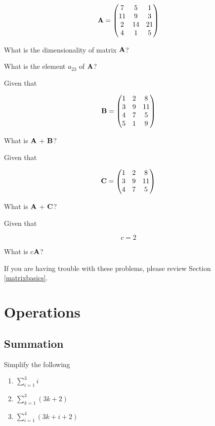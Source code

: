 \documentclass[
]{book}
\theoremstyle{definition}
\theoremstyle{definition}
\theoremstyle{definition}
\theoremstyle{definition}
\theoremstyle{remark}
\begin{document}
\[{\bf A}=\begin{pmatrix}
            7 & 5 & 1 \\
            11 & 9 & 3 \\ 
            2 & 14 & 21 \\ 
            4 & 1 & 5
        \end{pmatrix}\]

What is the dimensionality of matrix \({\bf A}\)?

What is the element \(a_{23}\) of \({\bf A}\)?

Given that

\[{\bf B}=\begin{pmatrix}
            1 & 2 & 8 \\
            3 & 9 & 11 \\ 
            4 & 7 & 5 \\ 
            5 & 1 & 9
        \end{pmatrix}\]

What is \({\bf A}\) + \({\bf B}\)?

Given that

\[{\bf C}=\begin{pmatrix}
            1 & 2 & 8 \\
            3 & 9 & 11 \\ 
            4 & 7 & 5 \\ 
        \end{pmatrix}\]

What is \({\bf A}\) + \({\bf C}\)?

Given that

\[c = 2\]

What is \(c\)\({\bf A}\)?

If you are having trouble with these problems, please review Section \ref{matrixbasics}.

\hypertarget{operations}{%
\section*{Operations}\label{operations}}

\hypertarget{summation}{%
\subsection*{Summation}\label{summation}}

Simplify the following

\begin{enumerate}
\def\labelenumi{\arabic{enumi}.}
\item
  \(\sum\limits_{i = 1}^3 i\)
\item
  \(\sum\limits_{k = 1}^3(3k + 2)\)
\item
  \(\sum\limits_{i= 1}^4 (3k + i + 2)\)
\end{enumerate}
\end{document}
